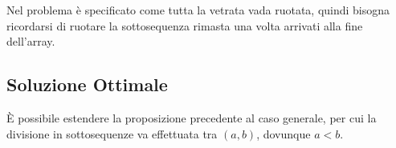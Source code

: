 Nel problema è specificato come tutta la vetrata vada ruotata, quindi bisogna ricordarsi di ruotare
la sottosequenza rimasta una volta arrivati alla fine dell'array.



\subsection*{Soluzione Ottimale}
È possibile estendere la proposizione precedente al caso generale, per cui la divisione in sottosequenze
va effettuata tra $(a, b)$, dovunque $a<b$. 
